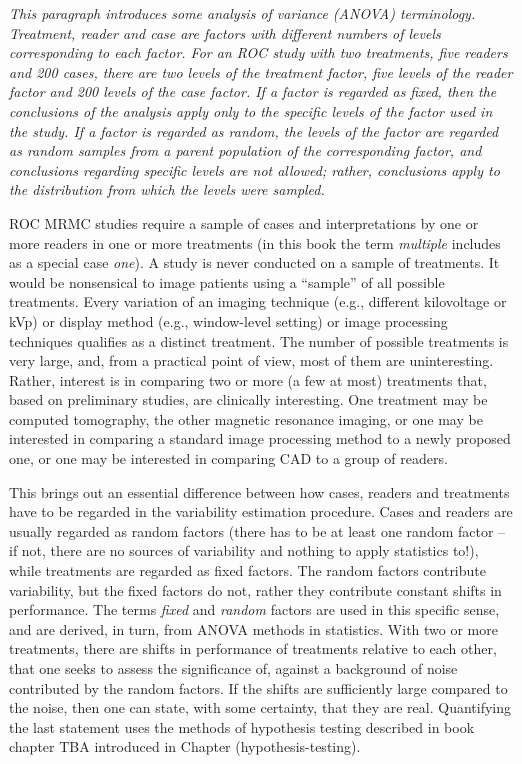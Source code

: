 \documentclass[
]{book}
\begin{document}
\emph{This paragraph introduces some analysis of variance (ANOVA) terminology. Treatment, reader and case are factors with different numbers of levels corresponding to each factor. For an ROC study with two treatments, five readers and 200 cases, there are two levels of the treatment factor, five levels of the reader factor and 200 levels of the case factor. If a factor is regarded as fixed, then the conclusions of the analysis apply only to the specific levels of the factor used in the study. If a factor is regarded as random, the levels of the factor are regarded as random samples from a parent population of the corresponding factor, and conclusions regarding specific levels are not allowed; rather, conclusions apply to the distribution from which the levels were sampled.}

ROC MRMC studies require a sample of cases and interpretations by one or more readers in one or more treatments (in this book the term \emph{multiple} includes as a special case \emph{one}). A study is never conducted on a sample of treatments. It would be nonsensical to image patients using a ``sample'' of all possible treatments. Every variation of an imaging technique (e.g., different kilovoltage or kVp) or display method (e.g., window-level setting) or image processing techniques qualifies as a distinct treatment. The number of possible treatments is very large, and, from a practical point of view, most of them are uninteresting. Rather, interest is in comparing two or more (a few at most) treatments that, based on preliminary studies, are clinically interesting. One treatment may be computed tomography, the other magnetic resonance imaging, or one may be interested in comparing a standard image processing method to a newly proposed one, or one may be interested in comparing CAD to a group of readers.

This brings out an essential difference between how cases, readers and treatments have to be regarded in the variability estimation procedure. Cases and readers are usually regarded as random factors (there has to be at least one random factor -- if not, there are no sources of variability and nothing to apply statistics to!), while treatments are regarded as fixed factors. The random factors contribute variability, but the fixed factors do not, rather they contribute constant shifts in performance. The terms \emph{fixed} and \emph{random} factors are used in this specific sense, and are derived, in turn, from ANOVA methods in statistics. With two or more treatments, there are shifts in performance of treatments relative to each other, that one seeks to assess the significance of, against a background of noise contributed by the random factors. If the shifts are sufficiently large compared to the noise, then one can state, with some certainty, that they are real. Quantifying the last statement uses the methods of hypothesis testing described in book chapter TBA introduced in Chapter (hypothesis-testing).
\end{document}
